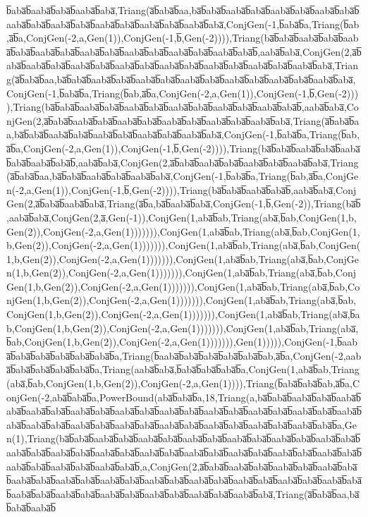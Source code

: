 b̅aba̅b̅aaba̅b̅aba̅b̅aaba̅b̅aba̅,Triang(a̅b̅aba̅b̅aa,ba̅b̅aba̅b̅aaba̅b̅aba̅b̅aaba̅b̅aba̅b̅aaba̅b̅aba̅b̅aaba̅b̅aba̅b̅aaba̅b̅aba̅b̅aaba̅b̅aba̅b̅aaba̅b̅aba̅b̅aaba̅b̅aba̅,ConjGen(-1,b̅aba̅b̅a,Triang(b̅ab,a̅b̅a,ConjGen(-2,a,Gen(1)),ConjGen(-1,b̅,Gen(-2)))),Triang(ba̅b̅aba̅b̅aaba̅b̅aba̅b̅aaba̅b̅aba̅b̅aaba̅b̅aba̅b̅aaba̅b̅aba̅b̅aaba̅b̅aba̅b̅aaba̅b̅aba̅b̅aaba̅b̅aba̅b̅,aaba̅b̅aba̅,ConjGen(2,a̅b̅aba̅b̅aaba̅b̅aba̅b̅aaba̅b̅aba̅b̅aaba̅b̅aba̅b̅aaba̅b̅aba̅b̅aaba̅b̅aba̅b̅aaba̅b̅aba̅b̅aaba̅b̅aba̅,Triang(a̅b̅aba̅b̅aa,ba̅b̅aba̅b̅aaba̅b̅aba̅b̅aaba̅b̅aba̅b̅aaba̅b̅aba̅b̅aaba̅b̅aba̅b̅aaba̅b̅aba̅b̅aaba̅b̅aba̅,ConjGen(-1,b̅aba̅b̅a,Triang(b̅ab,a̅b̅a,ConjGen(-2,a,Gen(1)),ConjGen(-1,b̅,Gen(-2)))),Triang(ba̅b̅aba̅b̅aaba̅b̅aba̅b̅aaba̅b̅aba̅b̅aaba̅b̅aba̅b̅aaba̅b̅aba̅b̅aaba̅b̅aba̅b̅,aaba̅b̅aba̅,ConjGen(2,a̅b̅aba̅b̅aaba̅b̅aba̅b̅aaba̅b̅aba̅b̅aaba̅b̅aba̅b̅aaba̅b̅aba̅b̅aaba̅b̅aba̅,Triang(a̅b̅aba̅b̅aa,ba̅b̅aba̅b̅aaba̅b̅aba̅b̅aaba̅b̅aba̅b̅aaba̅b̅aba̅b̅aaba̅b̅aba̅,ConjGen(-1,b̅aba̅b̅a,Triang(b̅ab,a̅b̅a,ConjGen(-2,a,Gen(1)),ConjGen(-1,b̅,Gen(-2)))),Triang(ba̅b̅aba̅b̅aaba̅b̅aba̅b̅aaba̅b̅aba̅b̅aaba̅b̅aba̅b̅,aaba̅b̅aba̅,ConjGen(2,a̅b̅aba̅b̅aaba̅b̅aba̅b̅aaba̅b̅aba̅b̅aaba̅b̅aba̅,Triang(a̅b̅aba̅b̅aa,ba̅b̅aba̅b̅aaba̅b̅aba̅b̅aaba̅b̅aba̅,ConjGen(-1,b̅aba̅b̅a,Triang(b̅ab,a̅b̅a,ConjGen(-2,a,Gen(1)),ConjGen(-1,b̅,Gen(-2)))),Triang(ba̅b̅aba̅b̅aaba̅b̅aba̅b̅,aaba̅b̅aba̅,ConjGen(2,a̅b̅aba̅b̅aaba̅b̅aba̅,Triang(a̅b̅a,ba̅b̅aaba̅b̅aba̅,ConjGen(-1,b̅,Gen(-2)),Triang(ba̅b̅,aaba̅b̅aba̅,ConjGen(2,a̅,Gen(-1)),ConjGen(1,aba̅b̅ab,Triang(aba̅,b̅ab,ConjGen(1,b,Gen(2)),ConjGen(-2,a,Gen(1))))))),ConjGen(1,aba̅b̅ab,Triang(aba̅,b̅ab,ConjGen(1,b,Gen(2)),ConjGen(-2,a,Gen(1))))))),ConjGen(1,aba̅b̅ab,Triang(aba̅,b̅ab,ConjGen(1,b,Gen(2)),ConjGen(-2,a,Gen(1))))))),ConjGen(1,aba̅b̅ab,Triang(aba̅,b̅ab,ConjGen(1,b,Gen(2)),ConjGen(-2,a,Gen(1))))))),ConjGen(1,aba̅b̅ab,Triang(aba̅,b̅ab,ConjGen(1,b,Gen(2)),ConjGen(-2,a,Gen(1))))))),ConjGen(1,aba̅b̅ab,Triang(aba̅,b̅ab,ConjGen(1,b,Gen(2)),ConjGen(-2,a,Gen(1))))))),ConjGen(1,aba̅b̅ab,Triang(aba̅,b̅ab,ConjGen(1,b,Gen(2)),ConjGen(-2,a,Gen(1))))))),ConjGen(1,aba̅b̅ab,Triang(aba̅,b̅ab,ConjGen(1,b,Gen(2)),ConjGen(-2,a,Gen(1))))))),ConjGen(1,aba̅b̅ab,Triang(aba̅,b̅ab,ConjGen(1,b,Gen(2)),ConjGen(-2,a,Gen(1))))))),Gen(1))))),ConjGen(-1,b̅aaba̅b̅aba̅b̅aba̅b̅aba̅b̅aba̅b̅aba̅b̅a,Triang(b̅aaba̅b̅aba̅b̅aba̅b̅aba̅b̅aba̅b̅ab,a̅b̅a,ConjGen(-2,aaba̅b̅aba̅b̅aba̅b̅aba̅b̅aba̅b̅a,Triang(aaba̅b̅aba̅,b̅aba̅b̅aba̅b̅aba̅b̅a,ConjGen(1,aba̅b̅ab,Triang(aba̅,b̅ab,ConjGen(1,b,Gen(2)),ConjGen(-2,a,Gen(1)))),Triang(b̅aba̅b̅aba̅b̅ab,a̅b̅a,ConjGen(-2,aba̅b̅aba̅b̅a,PowerBound(aba̅b̅aba̅b̅a,18,Triang(a,ba̅b̅aba̅b̅aaba̅b̅aba̅b̅aaba̅b̅aba̅b̅aaba̅b̅aba̅b̅aaba̅b̅aba̅b̅aaba̅b̅aba̅b̅aaba̅b̅aba̅b̅aaba̅b̅aba̅b̅aaba̅b̅aba̅b̅aaba̅b̅aba̅b̅aaba̅b̅aba̅b̅aaba̅b̅aba̅b̅aaba̅b̅aba̅b̅aaba̅b̅aba̅b̅aaba̅b̅aba̅b̅aaba̅b̅aba̅b̅aaba̅b̅aba̅b̅aaba̅b̅aba̅b̅a,Gen(1),Triang(ba̅b̅aba̅b̅aaba̅b̅aba̅b̅aaba̅b̅aba̅b̅aaba̅b̅aba̅b̅aaba̅b̅aba̅b̅aaba̅b̅aba̅b̅aaba̅b̅aba̅b̅aaba̅b̅aba̅b̅aaba̅b̅aba̅b̅aaba̅b̅aba̅b̅aaba̅b̅aba̅b̅aaba̅b̅aba̅b̅aaba̅b̅aba̅b̅aaba̅b̅aba̅b̅aaba̅b̅aba̅b̅aaba̅b̅aba̅b̅aaba̅b̅aba̅b̅aaba̅b̅aba̅b̅,a,ConjGen(2,a̅b̅aba̅b̅aaba̅b̅aba̅b̅aaba̅b̅aba̅b̅aaba̅b̅aba̅b̅aaba̅b̅aba̅b̅aaba̅b̅aba̅b̅aaba̅b̅aba̅b̅aaba̅b̅aba̅b̅aaba̅b̅aba̅b̅aaba̅b̅aba̅b̅aaba̅b̅aba̅b̅aaba̅b̅aba̅b̅aaba̅b̅aba̅b̅aaba̅b̅aba̅b̅aaba̅b̅aba̅b̅aaba̅b̅aba̅b̅aaba̅b̅aba̅b̅aaba̅b̅aba̅,Triang(a̅b̅aba̅b̅aa,ba̅b̅aba̅b̅aaba̅b̅